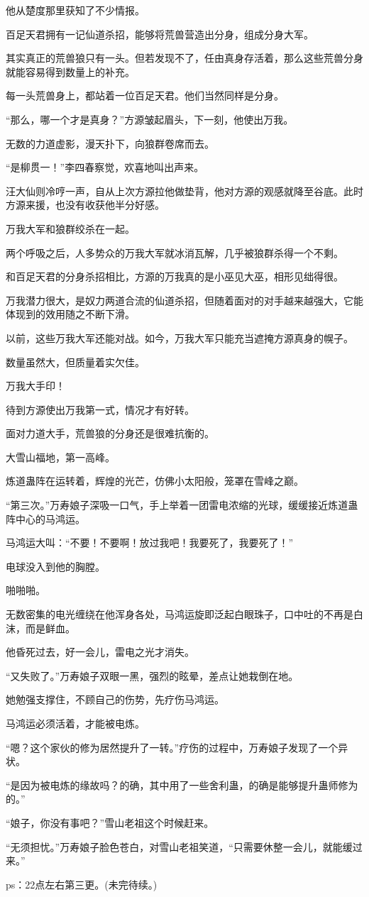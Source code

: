 \begin{this_body}
他从楚度那里获知了不少情报。

百足天君拥有一记仙道杀招，能够将荒兽营造出分身，组成分身大军。

其实真正的荒兽狼只有一头。但若发现不了，任由真身存活着，那么这些荒兽分身就能容易得到数量上的补充。

每一头荒兽身上，都站着一位百足天君。他们当然同样是分身。

“那么，哪一个才是真身？”方源皱起眉头，下一刻，他使出万我。

无数的力道虚影，漫天扑下，向狼群卷席而去。

“是柳贯一！”李四春察觉，欢喜地叫出声来。

汪大仙则冷哼一声，自从上次方源拉他做垫背，他对方源的观感就降至谷底。此时方源来援，也没有收获他半分好感。

万我大军和狼群绞杀在一起。

两个呼吸之后，人多势众的万我大军就冰消瓦解，几乎被狼群杀得一个不剩。

和百足天君的分身杀招相比，方源的万我真的是小巫见大巫，相形见绌得很。

万我潜力很大，是奴力两道合流的仙道杀招，但随着面对的对手越来越强大，它能体现到的效用随之不断下滑。

以前，这些万我大军还能对战。如今，万我大军只能充当遮掩方源真身的幌子。

数量虽然大，但质量着实欠佳。

万我大手印！

待到方源使出万我第一式，情况才有好转。

面对力道大手，荒兽狼的分身还是很难抗衡的。

大雪山福地，第一高峰。

炼道蛊阵在运转着，辉煌的光芒，仿佛小太阳般，笼罩在雪峰之巅。

“第三次。”万寿娘子深吸一口气，手上举着一团雷电浓缩的光球，缓缓接近炼道蛊阵中心的马鸿运。

马鸿运大叫：“不要！不要啊！放过我吧！我要死了，我要死了！”

电球没入到他的胸膛。

啪啪啪。

无数密集的电光缠绕在他浑身各处，马鸿运旋即泛起白眼珠子，口中吐的不再是白沫，而是鲜血。

他昏死过去，好一会儿，雷电之光才消失。

“又失败了。”万寿娘子双眼一黑，强烈的眩晕，差点让她栽倒在地。

她勉强支撑住，不顾自己的伤势，先疗伤马鸿运。

马鸿运必须活着，才能被电炼。

“嗯？这个家伙的修为居然提升了一转。”疗伤的过程中，万寿娘子发现了一个异状。

“是因为被电炼的缘故吗？的确，其中用了一些舍利蛊，的确是能够提升蛊师修为的。”

“娘子，你没有事吧？”雪山老祖这个时候赶来。

“无须担忧。”万寿娘子脸色苍白，对雪山老祖笑道，“只需要休整一会儿，就能缓过来。”

ps：22点左右第三更。(未完待续。)

\end{this_body}

